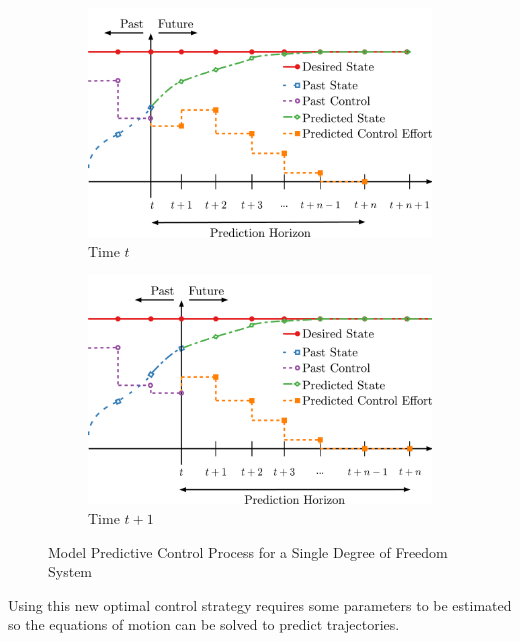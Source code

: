 \documentclass[letterpaper, 12 pt, conference]{ieeeconf}
\begin{document}
\begin{figure}[tb]
  \centering
  \begin{subfigure}{\columnwidth}
  \centering
  \includegraphics[width=\columnwidth]{Figures/MPC_theory.pdf}
  \caption{Time $t$}
  \label{fig:MPC_vanilla_t0}
  \end{subfigure}
  \vspace{0.05in}
  \begin{subfigure}{\columnwidth}
  \centering
  \includegraphics[width=\columnwidth]{Figures/MPC_theory_tp1.pdf}
  \caption{Time $t+1$}
  \label{fig:MPC_vanilla_tp1}
  \end{subfigure}
  \caption{Model Predictive Control Process for a Single Degree of Freedom System}
  \label{fig:MPC_vanilla}
\end{figure}
%

Using this new optimal control strategy requires some parameters to be estimated so the equations of motion can be solved to predict trajectories.
\end{document}
